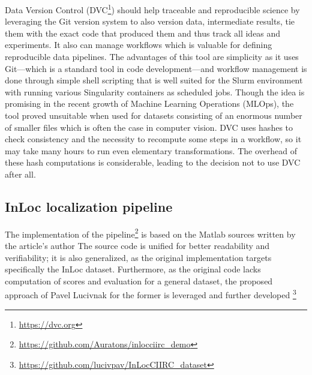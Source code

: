 Data Version Control (DVC\footnote{\url{https://dvc.org}}) should help traceable and
reproducible science by leveraging the Git version system to also version data,
intermediate results, tie them with the exact code that produced them and thus track all
ideas and experiments. It also can manage workflows which is valuable for defining
reproducible data pipelines. The advantages of this tool are simplicity as it uses
Git---which is a standard tool in code development---and workflow management is done
through simple shell scripting that is well suited for the Slurm environment with running
various Singularity containers as scheduled jobs. Though the idea is promising in the
recent growth of Machine Learning Operations (MLOps), the tool proved unsuitable when used
for datasets consisting of an enormous number of smaller files which is often the case in
computer vision. DVC uses hashes to check consistency and the necessity to recompute some
steps in a workflow, so it may take many hours to run even elementary transformations.
The overhead of these hash computations is considerable, leading to the decision not to
use DVC after all.

\subsection{InLoc localization pipeline} \label{subsec:inloc}

The implementation of the
pipeline\footnote{\url{https://github.com/Auratons/inlocciirc_demo}} is based on the
Matlab sources written by the article's author The
source code is unified for better readability and verifiability; it is also generalized,
as the original implementation targets specifically the InLoc
dataset. Furthermore, as
the original code lacks computation of scores and evaluation for a general dataset, the
proposed approach of Pavel Lucivnak for the former is leveraged and further
developed
\footnote{\url{https://github.com/lucivpav/InLocCIIRC_dataset}}

